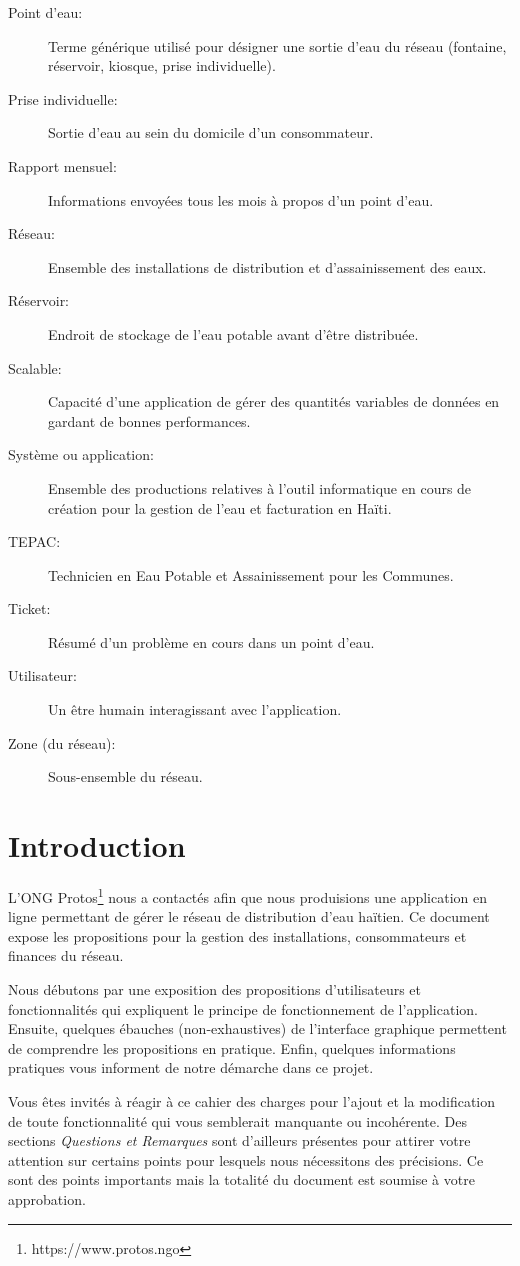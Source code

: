 \documentclass[a4paper, 11pt]{article}
\begin{document}
\begin{description}
    \item[Point d'eau:] Terme générique utilisé pour désigner une sortie d'eau du réseau (fontaine, réservoir, kiosque, prise individuelle).
    \item[Prise individuelle:] Sortie d'eau au sein du domicile d'un consommateur.
    \item[Rapport mensuel:] Informations envoyées tous les mois à propos d'un point d'eau.
    \item[Réseau:] Ensemble des installations de distribution et d'assainissement des eaux.
    \item[Réservoir:] Endroit de stockage de l'eau potable avant d'être distribuée.
    \item[Scalable:] Capacité d'une application de gérer des quantités variables de données en gardant de bonnes performances.
    \item[Système ou application:] Ensemble des productions relatives à l'outil informatique en cours de création pour la gestion de l'eau et facturation en Haïti.
    \item[TEPAC:] Technicien en Eau Potable et Assainissement pour les Communes.
    \item[Ticket:] Résumé d'un problème en cours dans un point d'eau.
    \item[Utilisateur:] Un être humain interagissant avec l'application.
    \item[Zone (du réseau):] Sous-ensemble du réseau.
  \end{description}
\section{Introduction}

L'ONG Protos\footnote{https://www.protos.ngo} nous a contactés afin que nous produisions une application en ligne permettant de gérer le réseau de distribution d'eau haïtien. Ce document expose les propositions pour la gestion des installations, consommateurs et finances du réseau.

Nous débutons par une exposition des propositions d'utilisateurs et fonctionnalités qui expliquent le principe de fonctionnement de l'application. Ensuite, quelques ébauches (non-exhaustives) de l'interface graphique permettent de comprendre les propositions en pratique. Enfin, quelques informations pratiques vous informent de notre démarche dans ce projet.

Vous êtes invités à réagir à ce cahier des charges pour l'ajout et la modification de toute fonctionnalité qui vous semblerait manquante ou incohérente. Des sections \emph{Questions et Remarques} sont d'ailleurs présentes pour attirer votre attention sur certains points pour lesquels nous nécessitons des précisions. Ce sont des points importants mais la totalité du document est soumise à votre approbation.
\end{document}
